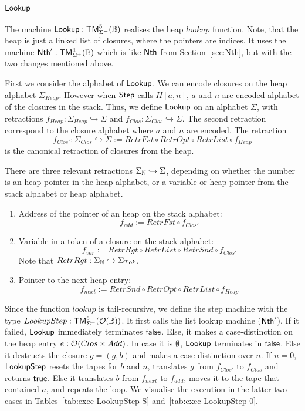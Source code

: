\subsection{$\mathsf{Lookup}$}
\label{sec:Lookup}

The machine $\mathsf{Lookup} : \mathsf{TM}_{\Sigma^+}^5(\mathbb{B})$ realises the heap $lookup$ function.  Note, that the heap is just a linked list of closures, where
the pointers are indices.  It uses the machine $\mathsf{Nth}' : \mathsf{TM}_{\Sigma^+}^4(\mathbb{B})$ which is like $\mathsf{Nth}$ from Section~\ref{sec:Nth}, but with the
two changes mentioned above.

First we consider the alphabet of $\mathsf{Lookup}$.  We can encode closures on the heap alphabet $\Sigma_{Heap}$.  However when $\mathsf{Step}$ calls
$H[a,n]$, $a$ and $n$ are encoded alphabet of the closures in the stack.  Thus, we define $\mathsf{Lookup}$ on an alphabet $\Sigma$, with retractions
$f_{Heap} : \Sigma_{Heap} \hookrightarrow \Sigma$ and $f_{Clos} : \Sigma_{Clos} \hookrightarrow \Sigma$.  The second retraction correspond to the
closure alphabet where $a$ and $n$ are encoded.  The retraction
\[ f_{Clos'} : \Sigma_{Clos} \hookrightarrow \Sigma := RetrFst \circ RetrOpt \circ RetrList \circ f_{Heap} \]%
is the canonical retraction of closures from the heap.

There are three relevant retractions $\Sigma_{\mathbb{N}} \hookrightarrow \Sigma$, depending on whether the number is an heap pointer in the heap alphabet,
or a variable or heap pointer from the stack alphabet or heap alphabet.
\begin{enumerate}
\item Address of the pointer of an heap on the stack alphabet:
  \[
    f_{add} := RetrFst \circ f_{Clos'}
  \]
\item Variable in a token of a closure on the stack alphabet:
  \[
    f_{var} := RetrRgt \circ RetrList \circ RetrSnd \circ f_{Clos'}
  \]
  Note that $RetrRgt : \Sigma_{\mathbb{N}} \hookrightarrow \Sigma_{Tok}$.
\item Pointer to the next heap entry:
  \[
    f_{next} := RetrSnd \circ RetrOpt \circ RetrList \circ f_{Heap}
  \]
\end{enumerate}

Since the function $lookup$ is tail-recursive, we define the step machine with the type $LookupStep : \mathsf{TM}_{\Sigma^+}^5(\mathcal{O}(\mathbb{B}))$.  It first
calls the list lookup machine ($\mathsf{Nth'}$).  If it failed, $\mathsf{Lookup}$ immediately terminates $\mathsf{false}$.  Else, it makes a case-distinction on the
heap entry $e : \mathcal{O}(Clos \times Add)$.  In case it is $\emptyset$, $\mathsf{Lookup}$ terminates in $\mathsf{false}$.  Else it destructs the closure $g = (g,b)$
and makes a case-distinction over $n$.  If $n=0$, $\mathsf{LookupStep}$ resets the tapes for $b$ and $n$, translates $g$ from $f_{Clos'}$ to $f_{Clos}$
and returns $\mathsf{true}$.  Else it translates $b$ from $f_{next}$ to $f_{add}$, moves it to the tape that contained $a$, and repeats the loop.  We
visualise the execution in the latter two cases in Tables~\ref{tab:exec-LookupStep-S} and~\ref{tab:exec-LookupStep-0}.

